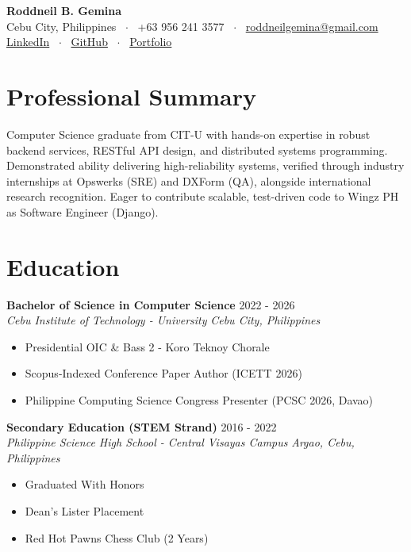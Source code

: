 \documentclass[letterpaper,10pt]{article}
\begin{document}
\begin{center}
    {\LARGE \textbf{Roddneil B. Gemina}} \\ \vspace{2pt}
    \small Cebu City, Philippines \ $\cdot$ \ +63 956 241 3577 \ $\cdot$ \ \href{mailto:roddneilgemina@gmail.com}{roddneilgemina@gmail.com} \\ \vspace{2pt}
    \href{https://www.linkedin.com/in/roddneil-gemina-20b423409}{LinkedIn} \ $\cdot$ \ \href{https://github.com/RoddneilGemina}{GitHub} \ $\cdot$ \ \href{https://roddneilgemina.github.io}{Portfolio}
\end{center}

\vspace{-4pt}
\section{Professional Summary}
Computer Science graduate from CIT-U with hands-on expertise in robust backend services, RESTful API design, and distributed systems programming. Demonstrated ability delivering high-reliability systems, verified through industry internships at Opswerks (SRE) and DXForm (QA), alongside international research recognition. Eager to contribute scalable, test-driven code to Wingz PH as Software Engineer (Django).

\section{Education}
\textbf{Bachelor of Science in Computer Science} \hfill 2022 - 2026
\\ \textit{Cebu Institute of Technology - University} \hfill \textit{Cebu City, Philippines}
\begin{itemize}
  \item Presidential OIC \& Bass 2 - Koro Teknoy Chorale
  \item Scopus-Indexed Conference Paper Author (ICETT 2026)
  \item Philippine Computing Science Congress Presenter (PCSC 2026, Davao)
\end{itemize}
\vspace{4pt}
\textbf{Secondary Education (STEM Strand)} \hfill 2016 - 2022
\\ \textit{Philippine Science High School - Central Visayas Campus} \hfill \textit{Argao, Cebu, Philippines}
\begin{itemize}
  \item Graduated With Honors
  \item Dean's Lister Placement
  \item Red Hot Pawns Chess Club (2 Years)
\end{itemize}
\vspace{4pt}
\end{document}
